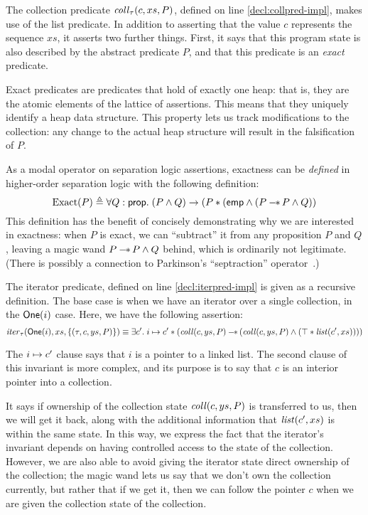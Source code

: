 The collection predicate $\mathit{coll}_\tau(c, xs, P)$, defined on line
\ref{decl:collpred-impl}, makes use of the list predicate. In addition
to asserting that the value $c$ represents the sequence $xs$, it
asserts two further things. First, it says that this program state is
also described by the abstract predicate $P$, and that this predicate
is an \emph{exact} predicate.

Exact predicates are predicates that hold of exactly one heap: that
is, they are the atomic elements of the lattice of assertions. This
means that they uniquely identify a heap data structure. This property
lets us track modifications to the collection: any change to the actual
heap structure will result in the falsification of $P$.  

As a modal operator on separation logic assertions, exactness can be
\emph{defined} in higher-order separation logic with the following
definition:
\begin{displaymath}
\mathrm{Exact}(P) \triangleq \forall Q:\mathsf{prop}.\; (P\land Q) \to (P * (\mathsf{emp} \land (P -\!\!*\, P \land Q))
\end{displaymath}
This definition has the benefit of concisely demonstrating why we are
interested in exactness: when $P$ is exact, we can ``subtract'' it
from any proposition $P$ and $Q$, leaving a magic wand $P -\!\!*\, P
\land Q$ behind, which is ordinarily not legitimate. (There is
possibly a connection to Parkinson's ``septraction''
operator~\cite{parkinson-septraction}.)


The iterator predicate, defined on line \ref{decl:iterpred-impl} is 
given as a recursive definition. The base case is when we have an 
iterator over a single collection, in the $\mathsf{One}(i)$ case.  Here, 
we have the following assertion: 
\begin{displaymath}
  \mathit{iter}_\tau(\mathsf{One}(i), xs, \{{(\tau, c, ys, P)}\}) \equiv 
    \exists c'.\; i \mapsto c' * (\mathit{coll}(c,ys,P) -\!\!*\, (\mathit{coll}(c, ys, P) \land (\top * \mathit{list}(c', xs))))
\end{displaymath}

The $i \mapsto c'$ clause says that $i$ is a pointer to a linked
list.  The second clause of this invariant is more complex, and its
purpose is to say that $c$ is an interior pointer into a collection.

It says if ownership of the collection state $\mathit{coll}(c, ys, P)$ is
transferred to us, then we will get it back, along with the additional
information that $\mathit{list}(c', xs)$ is within the same state. In this
way, we express the fact that the iterator's invariant depends on
having controlled access to the state of the collection. However, we
are also able to avoid giving the iterator state direct ownership of
the collection; the magic wand lets us say that we don't own the
collection currently, but rather that if we get it, then we can follow
the pointer $c$ when we are given the collection state of the
collection.

